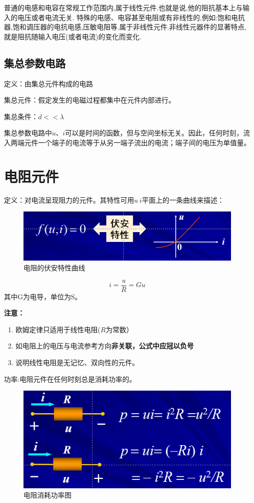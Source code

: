 \documentclass[11pt,a4paper,oneside]{book}
\begin{document}
普通的电感和电容在常规工作范围内,属于线性元件.也就是说,他的阻抗基本上与输入的电压或者电流无关. 特殊的电感、电容甚至电阻或有非线性的,例如:饱和电抗器,饱和调压器的电抗电感,压敏电阻等.属于非线性元件.非线性元器件的显著特点,就是阻抗随输入电压(或者电流)的变化而变化.
\subsection{集总参数电路}
定义：由集总元件构成的电路\par 集总元件：假定发生的电磁过程都集中在元件内部进行。\par 集总条件：$d<<\lambda$

集总参数电路中$u、i$可以是时间的函数，但与空间坐标无关。因此，任何时刻，流入两端元件一个端子的电流等于从另一端子流出的电流；端子间的电压为单值量。

\section{电阻元件}
定义：对电流呈现阻力的元件。其特性可用$u~i$平面上的一条曲线来描述：
\begin{figure}[H]
	\centering
	\includegraphics[width=0.7\linewidth]{screenshot111}
	\caption{电阻的伏安特性曲线}
	\label{fig:screenshot111}
\end{figure}
\begin{equation}
	i=\frac{u}{R}=Gu
\end{equation}
其中G为电导，单位为S。

\noindent \textbf{注意：}
\begin{enumerate}
	\item 欧姆定律只适用于线性电阻($R$为常数）
	\item 如电阻上的电压与电流参考方向\textbf{非关联，公式中应冠以负号}	
	\item 说明线性电阻是无记忆、双向性的元件。
\end{enumerate}
功率:电阻元件在任何时刻总是消耗功率的。
\begin{figure}[H]
	\centering
	\includegraphics[width=0.7\linewidth]{screenshot112}
	\caption{电阻消耗功率图}
	\label{fig:screenshot112}
\end{figure}
\end{document}
